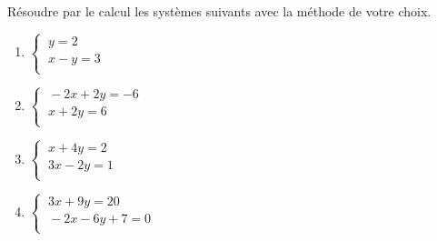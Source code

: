 \documentclass[a4paper,11pt,cours]{nsi}
\begin{document}
\begin{exercice}[ ]
	Résoudre par le calcul les systèmes suivants avec la méthode de votre choix.
	\begin{multicols}{2}
		\begin{enumerate}
			\item 	$\left\{
			\begin{array}{l}
				\ y=2 \\
				\ x-y=3 \\
			\end{array} \right.$
			\item 	$\left\{
			\begin{array}{l}
				\ -2x+2y=-6 \\
				\ x+2y=6 \\
			\end{array} \right.$	
			\item 	$\left\{
			\begin{array}{l}
				\ x+4y=2 \\
				\ 3x-2y=1 \\
			\end{array} \right.$
			\item 	$\left\{
			\begin{array}{l}
				\ 3x+9y=20 \\
				\ -2x-6y+7=0 \\
			\end{array} \right.$
		\end{enumerate}
	\end{multicols}
\end{exercice}
\end{document}
